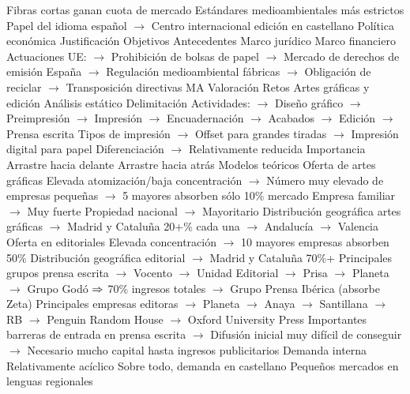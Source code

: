 \documentclass{nuevotema}
\begin{document}
\begin{esquemal}
				\4[] Fibras cortas ganan cuota de mercado
				\4[] Estándares medioambientales más estrictos
				\4[] Papel del idioma español
				\4[] $\to$ Centro internacional edición en castellano
			\3 Política económica
				\4 Justificación
				\4 Objetivos
				\4 Antecedentes
				\4 Marco jurídico
				\4 Marco financiero
				\4 Actuaciones
				\4[] UE:
				\4[] $\to$ Prohibición de bolsas de papel
				\4[] $\to$ Mercado de derechos de emisión
				\4[] España
				\4[] $\to$ Regulación medioambiental fábricas
				\4[] $\to$ Obligación de reciclar
				\4[] $\to$ Transposición directivas MA
				\4 Valoración
				\4 Retos
		\2 Artes gráficas y edición
			\3 Análisis estático
				\4 Delimitación
				\4[] Actividades:
				\4[] $\to$ Diseño gráfico
				\4[] $\to$ Preimpresión
				\4[] $\to$ Impresión
				\4[] $\to$ Encuadernación
				\4[] $\to$ Acabados
				\4[] $\to$ Edición
				\4[] $\to$ Prensa escrita
				\4[] Tipos de impresión
				\4[] $\to$ Offset para grandes tiradas
				\4[] $\to$ Impresión digital para papel
				\4[] Diferenciación
				\4[] $\to$ Relativamente reducida
				\4 Importancia
				\4[] Arrastre hacia delante
				\4[] Arrastre hacia atrás
				\4 Modelos teóricos
				\4 Oferta de artes gráficas
				\4[] Elevada atomización/baja concentración
				\4[] $\to$ Número muy elevado de empresas pequeñas
				\4[] $\to$ 5 mayores absorben sólo 10\% mercado
				\4[] Empresa familiar
				\4[] $\to$ Muy fuerte
				\4[] Propiedad nacional
				\4[] $\to$ Mayoritario
				\4[] Distribución geográfica artes gráficas
				\4[] $\to$ Madrid y Cataluña 20+\% cada una
				\4[] $\to$ Andalucía
				\4[] $\to$ Valencia
				\4 Oferta en editoriales
				\4[] Elevada concentración
				\4[] $\to$ 10 mayores empresas absorben 50\%
				\4[] Distribución geográfica editorial
				\4[] $\to$ Madrid y Cataluña 70\%+
				\4[] Principales grupos prensa escrita
				\4[] $\to$ Vocento
				\4[] $\to$ Unidad Editorial
				\4[] $\to$ Prisa
				\4[] $\to$ Planeta
				\4[] $\to$ Grupo Godó
				\4[] $\Rightarrow$ 70\% ingresos totales
				\4[] $\to$ Grupo Prensa Ibérica (absorbe Zeta)
				\4[] Principales empresas editoras
				\4[] $\to$ Planeta
				\4[] $\to$ Anaya
				\4[] $\to$ Santillana
				\4[] $\to$ RB
				\4[] $\to$ Penguin Random House
				\4[] $\to$ Oxford University Press
				\4[] Importantes barreras de entrada en prensa escrita
				\4[] $\to$ Difusión inicial muy difícil de conseguir
				\4[] $\to$ Necesario mucho capital hasta ingresos publicitarios
				\4 Demanda interna
				\4[] Relativamente acíclico
				\4[] Sobre todo, demanda en castellano
				\4[] Pequeños mercados en lenguas regionales

\end{esquemal}
\end{document}
